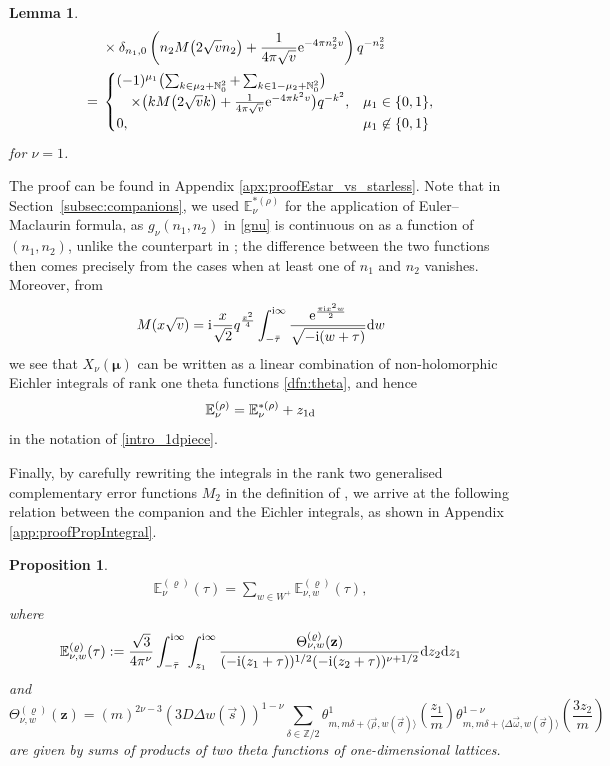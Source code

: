 \documentclass[pdftex]{sigma}
\def\be{\begin{equation}} \def\ee{\end{equation}}
\def\BN{\mathbb{N}}
\def\BZ{\mathbb{Z}}
\def\BE{\mathbb{E}}
\def\bos{\varrho}
\def\bmu{\boldsymbol{\mu}}
\newtheorem{prop}[thm]{Proposition}
\newtheorem{lem}[thm]{Lemma}
\theoremstyle{definition}
\numberwithin{equation}{section}
\begin{document}
\begin{lem}
\begin{align*}
&\times \delta_{n_{1},0}\left( n_{2}M\bigl( 2\sqrt{v}n_{2} \bigr)+\frac{1}{4\pi\sqrt{v}}{\rm e}^{-4\pi n_{2}^{2}v} \right)q^{-n_{2}^2} \\
 ={}& \begin{cases}
( -1 )^{\mu_{1}}\bigl( \sum_{k\in\mu_{2}+\BN_{0}^{2}}+\sum_{k\in1-\mu_{2}+\BN_{0}^{2}} \bigr)\\
\quad\times\bigl( kM\bigl( 2\sqrt{v}k \bigr)+\frac{1}{4\pi\sqrt{v}}{\rm e}^{-4\pi k^{2}v} \bigr)q^{-k^{2}}, & \mu_{1}\in \{ 0,1 \},\\
 0, & \mu_{1}\not\in\{ 0,1 \}
 \end{cases}
\end{align*}
for $\nu = 1$.

\end{lem}
The proof can be found in Appendix \ref{apx:proofEstar_vs_starless}.
Note that in Section~\ref{subsec:companions}, we used $\mathbb{E}^{*(\rho)}_{\nu}$ for the application of Euler--Maclaurin formula, as $g_\nu(n_1,n_2)$ in \eqref{gnu} is continuous on  as a function of $(n_1,n_2)$, unlike the counterpart in ; the difference between the two functions then comes precisely from the cases when at least one of $n_1$ and $n_2$ vanishes. Moreover, from \cite{zwegers2008mock}
\[
M(x\sqrt{v})={\rm i}\frac{x}{\sqrt{2}} q^{\frac{x^2}{4}} \int_{-\bar{\tau}}^{{\rm i}\infty} \frac{{\rm e}^{\frac{\pi {\rm i} x^2 w}{2}}}{\sqrt{-{\rm i}(w+\tau)}}{\rm d}w
\]
we see that $X_\nu(\bmu)$ can be written as a linear combination of non-holomorphic Eichler integrals of rank one theta functions \eqref{dfn:theta}, and hence
\begin{equation*}
\mathbb{E}^{(\rho)}_{\nu}=\mathbb{E}^{*(\rho)}_{\nu} + z_{1\rm d}
\end{equation*}
in the notation of \eqref{intro_1dpiece}.

Finally, by carefully rewriting the integrals in the rank two generalised complementary error functions $M_2$ in the definition of \smash{$\BE_\nu^{(\bos)}$}, we arrive at the following relation between the companion and the Eichler integrals, as shown in Appendix \ref{app:proofPropIntegral}.

\begin{prop}\label{prop:Estarless_eichler}
\begin{gather*} %
	\BE_\nu^{(\bos)}(\tau) = \sum_{{w} \in W^+} \BE_{\nu,w}^{(\bos)}(\tau),
 \end{gather*}
where
\be\label{Eichler_Enu_Com}
	\BE_{\nu,w}^{(\bos)}(\tau) := \frac{\sqrt{3}}{4 \pi^{\nu}}
	\int_{-\bar{\tau}}^{{\rm i} \infty}\int_{z_1}^{{\rm i} \infty}
	\frac{ \Theta_{\nu,w}^{(\bos)}(
	{\bf z})}{({-{\rm i}(z_1+\tau)})^{1/2} (-{\rm i}(z_2+\tau))^{\nu+1/2}}{\rm d}z_2{\rm d}z_1
\ee
and
\be\label{def:Theta}
 \Theta_{\nu,w}^{(\bos)}(\mathbf{z}) = (m)^{2\nu-3}	\left( {3D\Delta w(\vec{s})} \right)^{1-\nu} \sum_{\delta\in\BZ/2}
\theta^1_{m,m\delta + \langle\vec{\rho},w(\vec{\sigma})\rangle} \left(\frac{z_1}{m}\right)
\theta^{1-\nu}_{m,m\delta + \langle \Delta\vec\omega, w(\vec{\sigma})\rangle}\left(\frac{3z_2}{m} \right)
\ee
are given by sums of products of two theta functions of one-dimensional lattices.
\end{prop}
\end{document}
